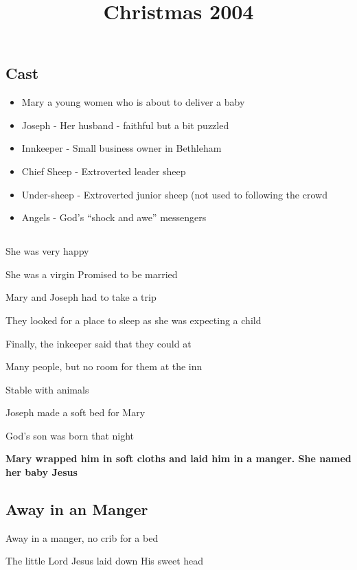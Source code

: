 \documentclass[
  letterpaper,
  DIV=11,
  numbers=noendperiod]{scrartcl}
\title{Christmas 2004}
\author{}
\date{}
\providecommand{\tightlist}{%
  \setlength{\itemsep}{0pt}\setlength{\parskip}{0pt}}\usepackage{longtable,booktabs,array}
\begin{document}
\maketitle


\subsection{Cast}\label{cast}

\begin{itemize}
\tightlist
\item
  Mary a young women who is about to deliver a baby
\item
  Joseph - Her husband - faithful but a bit puzzled
\item
  Innkeeper - Small business owner in Bethleham
\item
  Chief Sheep - Extroverted leader sheep
\item
  Under-sheep - Extroverted junior sheep (not used to following the
  crowd
\item
  Angels - God's ``shock and awe'' messengers
\end{itemize}

\subsection{}\label{section}

She was very happy

She was a virgin Promised to be married

Mary and Joseph had to take a trip

They looked for a place to sleep as she was expecting a child

Finally, the inkeeper said that they could at

Many people, but no room for them at the inn

Stable with animals

Joseph made a soft bed for Mary

God's son was born that night

\textbf{Mary wrapped him in soft cloths and laid him in a manger. She
named her baby Jesus}

\subsection{Away in an Manger}\label{away-in-an-manger}

Away in a manger, no crib for a bed

The little Lord Jesus laid down His sweet head
\end{document}
